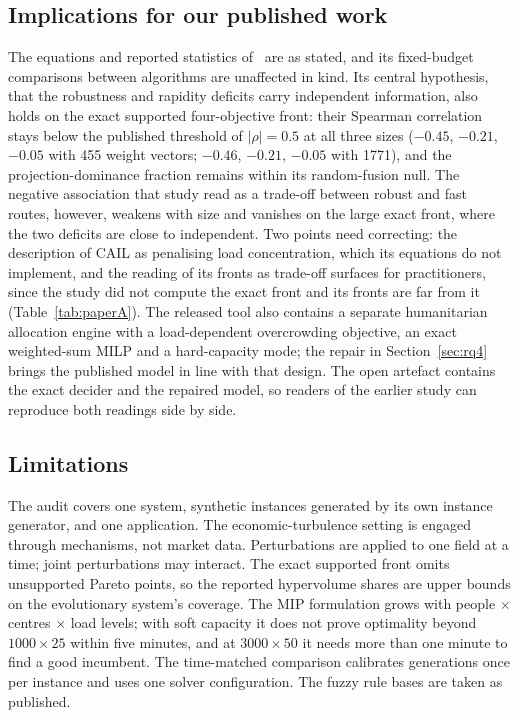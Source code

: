 \documentclass[systems,article,submit,moreauthors,pdftex]{Definitions/mdpi}
\begin{document}
\subsection{Implications for our published work}
The equations and reported statistics of~\cite{rabiei2026resilient} are as stated, and its
fixed-budget comparisons between algorithms are unaffected in kind. Its central hypothesis,
that the robustness and rapidity deficits carry independent information, also holds on the
exact supported four-objective front: their Spearman correlation stays below the published
threshold of $|\rho| = 0.5$ at all three sizes ($-0.45$, $-0.21$, $-0.05$ with 455 weight
vectors; $-0.46$, $-0.21$, $-0.05$ with 1771), and the projection-dominance fraction remains
within its random-fusion null. The negative association that study read as a trade-off
between robust and fast routes, however, weakens with size and vanishes on the large exact
front, where the two deficits are close to independent.
Two points need correcting: the description of CAIL as penalising load concentration, which
its equations do not implement, and the reading of its fronts as trade-off surfaces for
practitioners, since the study did not compute the exact front and its fronts are far from
it (Table~\ref{tab:paperA}). The released tool also contains a separate humanitarian
allocation engine with a load-dependent overcrowding objective, an exact weighted-sum MILP and
a hard-capacity mode; the repair in Section~\ref{sec:rq4} brings the published model in line
with that design. The open artefact contains the exact decider and the repaired model, so
readers of the earlier study can reproduce both readings side by side.

\subsection{Limitations}
The audit covers one system, synthetic instances generated by its own instance generator,
and one application. The economic-turbulence setting is engaged through mechanisms, not
market data. Perturbations are applied to one field at a time; joint perturbations may
interact. The exact supported front omits unsupported Pareto points, so the reported
hypervolume shares are upper bounds on the evolutionary system's coverage. The MIP
formulation grows with people $\times$ centres $\times$ load levels; with soft capacity it
does not prove optimality beyond $1000\times25$ within five minutes, and at $3000\times50$ it
needs more than one minute to find a good incumbent. The time-matched comparison calibrates
generations once per instance and uses one solver configuration. The fuzzy rule bases are taken as published.
\end{document}

